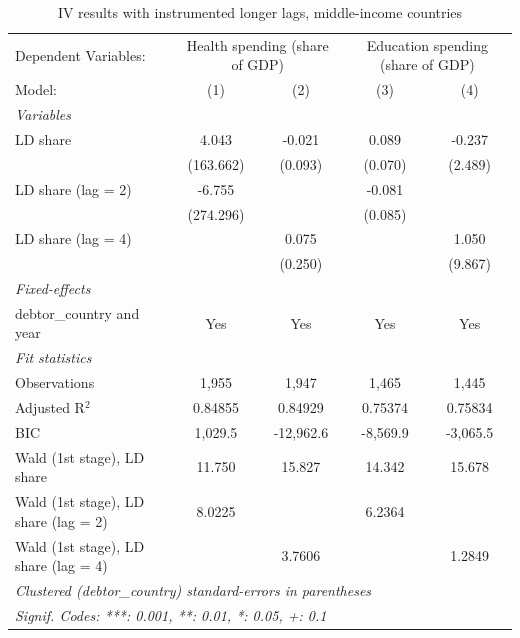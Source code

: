 
\begin{table}[htbp]
   \caption{\label{tab:results_iv_instr_long_lags_other} IV results with instrumented longer lags, middle-income countries}
   \centering
   \begin{tabular}{lcccc}
      \tabularnewline \midrule \midrule
      Dependent Variables: & \multicolumn{2}{c}{Health spending (share of GDP)} & \multicolumn{2}{c}{Education spending (share of GDP)}\\
      Model:                               & (1)       & (2)       & (3)      & (4)\\  
      \midrule
      \emph{Variables}\\
      LD share                             & 4.043     & -0.021    & 0.089    & -0.237\\   
                                           & (163.662) & (0.093)   & (0.070)  & (2.489)\\   
      LD share (lag = 2)                   & -6.755    &           & -0.081   &   \\   
                                           & (274.296) &           & (0.085)  &   \\   
      LD share (lag = 4)                   &           & 0.075     &          & 1.050\\   
                                           &           & (0.250)   &          & (9.867)\\   
      \midrule
      \emph{Fixed-effects}\\
      debtor\_country and year             & Yes       & Yes       & Yes      & Yes\\  
      \midrule
      \emph{Fit statistics}\\
      Observations                         & 1,955     & 1,947     & 1,465    & 1,445\\  
      Adjusted R$^2$                       & 0.84855   & 0.84929   & 0.75374  & 0.75834\\  
      BIC                                  & 1,029.5   & -12,962.6 & -8,569.9 & -3,065.5\\  
      Wald (1st stage), LD share           & 11.750    & 15.827    & 14.342   & 15.678\\  
      Wald (1st stage), LD share (lag = 2) & 8.0225    &           & 6.2364   & \\  
      Wald (1st stage), LD share (lag = 4) &           & 3.7606    &          & 1.2849\\  
      \midrule \midrule
      \multicolumn{5}{l}{\emph{Clustered (debtor\_country) standard-errors in parentheses}}\\
      \multicolumn{5}{l}{\emph{Signif. Codes: ***: 0.001, **: 0.01, *: 0.05, +: 0.1}}\\
   \end{tabular}
\end{table}


